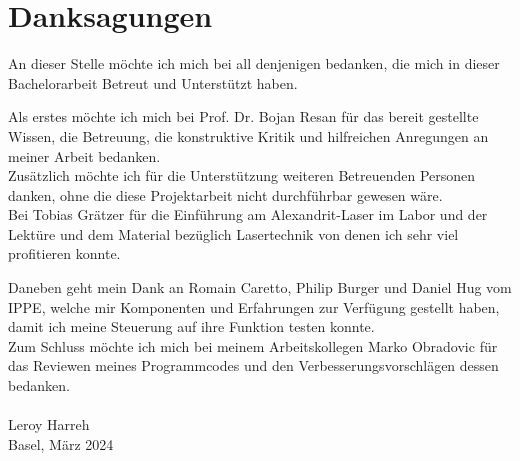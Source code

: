 \section*{Danksagungen}
An dieser Stelle möchte ich mich bei all denjenigen bedanken, die mich in dieser Bachelorarbeit Betreut und Unterstützt haben.

Als erstes möchte ich mich bei Prof. Dr. Bojan Resan für das bereit gestellte Wissen, die Betreuung, die konstruktive Kritik und hilfreichen Anregungen an meiner Arbeit bedanken.\\

Zusätzlich möchte ich für die Unterstützung weiteren Betreuenden Personen danken, ohne die diese Projektarbeit nicht durchführbar gewesen wäre.\\ Bei Tobias Grätzer für die Einführung am Alexandrit-Laser im Labor und der Lektüre und dem Material bezüglich Lasertechnik von denen ich sehr viel profitieren konnte.

Daneben geht mein Dank an Romain Caretto, Philip Burger und Daniel Hug vom IPPE, welche mir Komponenten und Erfahrungen zur Verfügung gestellt haben, damit ich meine Steuerung auf ihre Funktion testen konnte.\\

Zum Schluss möchte ich mich bei meinem Arbeitskollegen Marko Obradovic für das Reviewen meines Programmcodes und den Verbesserungsvorschlägen dessen bedanken.
\\\\
Leroy Harreh\\
Basel, März 2024

